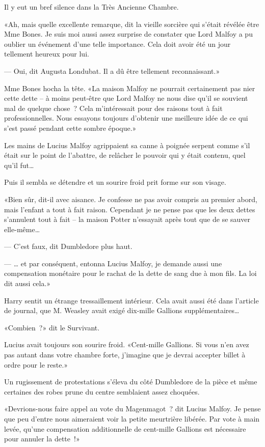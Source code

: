 Il y eut un bref silence dans la Très Ancienne Chambre.

«Ah, mais quelle excellente remarque, dit la vieille sorcière qui s'était révélée être Mme Bones. Je suis moi aussi assez surprise de constater que Lord Malfoy a pu oublier un événement d'une telle importance. Cela doit avoir été un jour tellement heureux pour lui.

--- Oui, dit Augusta Londubat. Il a dû être tellement reconnaissant.»

Mme Bones hocha la tête. «La maison Malfoy ne pourrait certainement pas nier cette dette -- à moins peut-être que Lord Malfoy ne nous dise qu'il se souvient mal de quelque chose~? Cela m'intéressait pour des raisons tout à fait professionnelles. Nous essayons toujours d'obtenir une meilleure idée de ce qui s'est passé pendant cette sombre époque.»

Les mains de Lucius Malfoy agrippaient sa canne à poignée serpent comme s'il était sur le point de l'abattre, de relâcher le pouvoir qui y était contenu, quel qu'il fut…

Puis il sembla se détendre et un sourire froid prit forme sur son visage.

«Bien sûr, dit-il avec aisance. Je confesse ne pas avoir compris au premier abord, mais l'enfant a tout à fait raison. Cependant je ne pense pas que les deux dettes s'annulent tout à fait -- la maison Potter n'essayait après tout que de se sauver elle-même…

--- C'est faux, dit Dumbledore plus haut.

--- … et par conséquent, entonna Lucius Malfoy, je demande aussi une compensation monétaire pour le rachat de la dette de sang due à mon fils. La loi dit aussi cela.»

Harry sentit un étrange tressaillement intérieur. Cela avait aussi été dans l'article de journal, que M. Weasley avait exigé dix-mille Gallions supplémentaires…

«Combien~?» dit le Survivant.

Lucius avait toujours son sourire froid. «Cent-mille Gallions. Si vous n'en avez pas autant dans votre chambre forte, j'imagine que je devrai accepter billet à ordre pour le reste.»

Un rugissement de protestations s'éleva du côté Dumbledore de la pièce et même certaines des robes prune du centre semblaient assez choquées.

«Devrions-nous faire appel au vote du Magenmagot~? dit Lucius Malfoy. Je pense que peu d'entre nous aimeraient voir la petite meurtrière libérée. Par vote à main levée, qu'une compensation additionnelle de cent-mille Gallions est nécessaire pour annuler la dette~!»

